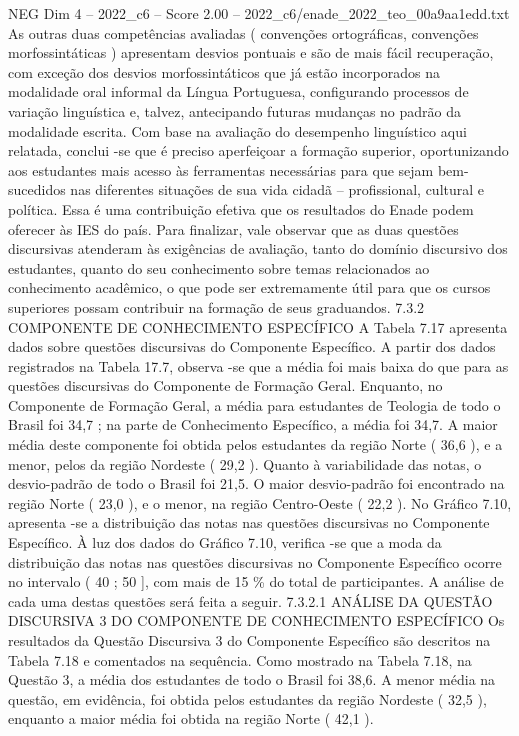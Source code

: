 \begin{textsample}{NEG Dim 4 – 2022\_c6 – Score 2.00 – 2022\_c6/enade\_2022\_teo\_00a9aa1edd.txt}
As outras duas competências avaliadas ( convenções ortográficas, convenções morfossintáticas ) apresentam desvios pontuais e são de mais fácil recuperação, com exceção dos desvios morfossintáticos que já estão incorporados na modalidade oral informal da Língua Portuguesa, configurando processos de variação linguística e, talvez, antecipando futuras mudanças no padrão da modalidade escrita.
Com base na avaliação do desempenho linguístico aqui relatada, conclui -se que é preciso aperfeiçoar a formação superior, oportunizando aos estudantes mais acesso às ferramentas necessárias para que sejam bem-sucedidos nas diferentes situações de sua vida cidadã – profissional, cultural e política.
Essa é uma contribuição efetiva que os resultados do Enade podem oferecer às IES do país.
Para finalizar, vale observar que as duas questões discursivas atenderam às exigências de avaliação, tanto do domínio discursivo dos estudantes, quanto do seu conhecimento sobre temas relacionados ao conhecimento acadêmico, o que pode ser extremamente útil para que os cursos superiores possam contribuir na formação de seus graduandos. 7.3.2 COMPONENTE DE CONHECIMENTO ESPECÍFICO A Tabela 7.17 apresenta dados sobre questões discursivas do Componente Específico.
A partir dos dados registrados na Tabela 17.7, observa -se que a média foi mais baixa do que para as questões discursivas do Componente de Formação Geral.
Enquanto, no Componente de Formação Geral, a média para estudantes de Teologia de todo o Brasil foi 34,7 ; na parte de Conhecimento Específico, a média foi 34,7.
A maior média deste componente foi obtida pelos estudantes da região Norte ( 36,6 ), e a menor, pelos da região Nordeste ( 29,2 ).
Quanto à variabilidade das notas, o desvio-padrão de todo o Brasil foi 21,5.
O maior desvio-padrão foi encontrado na região Norte ( 23,0 ), e o menor, na região Centro-Oeste ( 22,2 ).
No Gráfico 7.10, apresenta -se a distribuição das notas nas questões discursivas no Componente Específico.
À luz dos dados do Gráfico 7.10, verifica -se que a moda da distribuição das notas nas questões discursivas no Componente Específico ocorre no intervalo ( 40 ; 50 ], com mais de 15 \% do total de participantes.
A análise de cada uma destas questões será feita a seguir. 7.3.2.1 ANÁLISE DA QUESTÃO DISCURSIVA 3 DO COMPONENTE DE CONHECIMENTO ESPECÍFICO Os resultados da Questão Discursiva 3 do Componente Específico são descritos na Tabela 7.18 e comentados na sequência.
Como mostrado na Tabela 7.18, na Questão 3, a média dos estudantes de todo o Brasil foi 38,6.
A menor média na questão, em evidência, foi obtida pelos estudantes da região Nordeste ( 32,5 ), enquanto a maior média foi obtida na região Norte ( 42,1 ).

\end{textsample}
